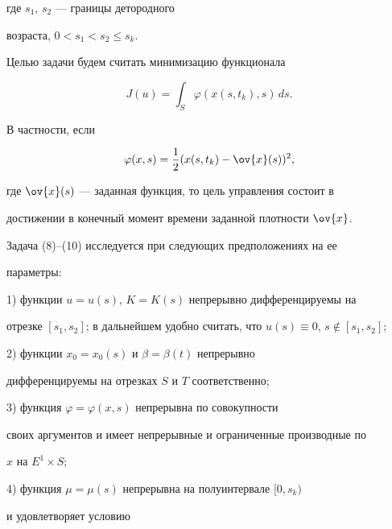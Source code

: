 где $s_1$, $s_2$ --- границы детородного


возраста, $ 0 < s_1 < s_2 \leq s_k$.





Целью задачи будем считать минимизацию функционала


\begin{equation}


J(u)= \int_{S} \varphi(x(s,t_k),s)\,ds.


\end{equation}


В частности, если


$$


\varphi(x,s) = \frac{1}{2}(x(s,t_k) - \ov{x}(s))^2,


$$


где $\ov{x}(s)$ --- заданная функция, то цель управления состоит в


достижении в конечный момент времени заданной плотности $\ov{x}$.





Задача (8)--(10) исследуется при следующих предположениях на ее


параметры:





1) функции $u=u(s)$, $K=K(s)$ непрерывно дифференцируемы на


отрезке $[s_1, s_2]$; в дальнейшем  удобно считать, что $ u(s)


\equiv 0$, $s \notin [s_1, s_2]$;





2) функции $x_0 =x_0(s)$ и $\beta = \beta (t)$ непрерывно


дифференцируемы на отрезках $S$ и $T$ соответственно;





3) функция $\varphi = \varphi (x,s)$ непрерывна по совокупности


своих аргументов и имеет непрерывные и ограниченные производные по


$x$ на $E^1 \times S$;





4) функция $\mu = \mu (s)$ непрерывна на полуинтервале $[0, s_k)$


и удовлетворяет условию


$$


